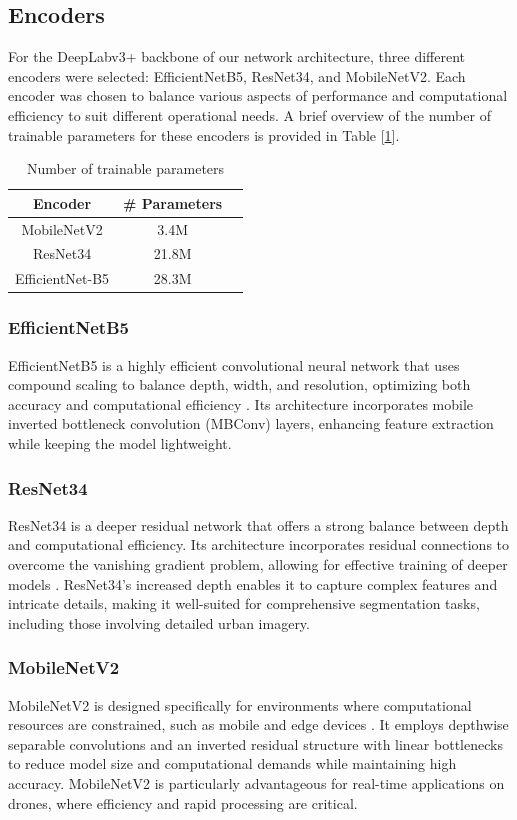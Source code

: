 \documentclass[a4paper]{article}
\begin{document}
\subsection{Encoders}
For the DeepLabv3+ backbone of our network architecture, three different encoders were selected: EfficientNetB5, ResNet34, and MobileNetV2. Each encoder was chosen to balance various aspects of performance and computational efficiency to suit different operational needs. A brief overview of the number of trainable parameters for these encoders is provided in Table [\ref{table:encoders}].

\begin{table}[h]
\centering
\begin{tabular}{|c|c|c|}
\hline
\textbf{Encoder} & \textbf{\# Parameters} \\ \hline
MobileNetV2 & 3.4M \\ \hline
ResNet34 & 21.8M \\ \hline
EfficientNet-B5 & 28.3M \\ \hline
\end{tabular}
\caption{Number of trainable parameters}
\label{table:encoders}
\end{table}

\subsubsection{EfficientNetB5}
EfficientNetB5 is a highly efficient convolutional neural network that uses compound scaling to balance depth, width, and resolution, optimizing both accuracy and computational efficiency \cite{efficientnet2019}. Its architecture incorporates mobile inverted bottleneck convolution (MBConv) layers, enhancing feature extraction while keeping the model lightweight.

\subsubsection{ResNet34}
ResNet34 is a deeper residual network that offers a strong balance between depth and computational efficiency. Its architecture incorporates residual connections to overcome the vanishing gradient problem, allowing for effective training of deeper models \cite{resnet2016}. ResNet34's increased depth enables it to capture complex features and intricate details, making it well-suited for comprehensive segmentation tasks, including those involving detailed urban imagery.

\subsubsection{MobileNetV2}
MobileNetV2 is designed specifically for environments where computational resources are constrained, such as mobile and edge devices \cite{mobilenetv22018}. It employs depthwise separable convolutions and an inverted residual structure with linear bottlenecks to reduce model size and computational demands while maintaining high accuracy. MobileNetV2 is particularly advantageous for real-time applications on drones, where efficiency and rapid processing are critical.
\end{document}
